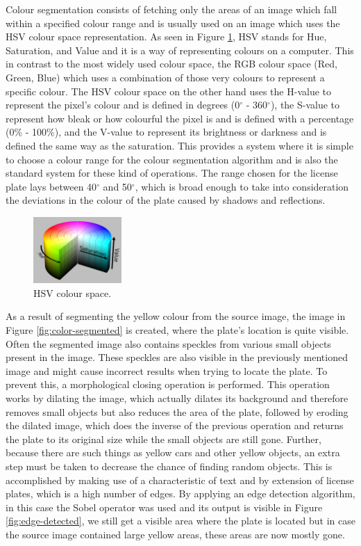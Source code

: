 Colour segmentation consists of fetching only the areas of an image which fall within a specified colour range and is usually used on an image which uses the HSV colour space representation. As seen in Figure \ref{fig:hsv}, HSV stands for Hue, Saturation, and Value and it is a way of representing colours on a computer. This in contrast to the most widely used colour space, the RGB colour space (Red, Green, Blue) which uses a combination of those very colours to represent a specific colour. The HSV colour space on the other hand uses the H-value to represent the pixel's colour and is defined in degrees (0$^{\circ}$ - 360$^{\circ}$), the S-value to represent how bleak or how colourful the pixel is and is defined with a percentage (0\% - 100\%), and the V-value to represent its brightness or darkness and is defined the same way as the saturation. This provides a system where it is simple to choose a colour range for the colour segmentation algorithm and is also the standard system for these kind of operations. The range chosen for the license plate lays between 40$^{\circ}$ and 50$^{\circ}$, which is broad enough to take into consideration the deviations in the colour of the plate caused by shadows and reflections.

\begin{figure}[ht]
    \centering
    \includegraphics[width=0.3\textwidth]{plaatjes/hsv}
    \caption{HSV colour space. \cite{hsv-fig}}
    \label{fig:hsv}
\end{figure}

As a result of segmenting the yellow colour from the source image, the image in Figure \ref{fig:color-segmented} is created, where the plate's location is quite visible. Often the segmented image also contains speckles from various small objects present in the image. These speckles are also visible in the previously mentioned image and might cause incorrect results when trying to locate the plate. To prevent this, a morphological closing operation \cite{morphclose} is performed. This operation works by dilating the image, which actually dilates its background and therefore removes small objects but also reduces the area of the plate, followed by eroding the dilated image, which does the inverse of the previous operation and returns the plate to its original size while the small objects are still gone. Further, because there are such things as yellow cars and other yellow objects, an extra step must be taken to decrease the chance of finding random objects. This is accomplished by making use of a characteristic of text and by extension of license plates, which is a high number of edges. By applying an edge detection algorithm, in this case the Sobel operator \cite{sobel} was used and its output is visible in Figure \ref{fig:edge-detected}, we still get a visible area where the plate is located but in case the source image contained large yellow areas, these areas are now mostly gone.

